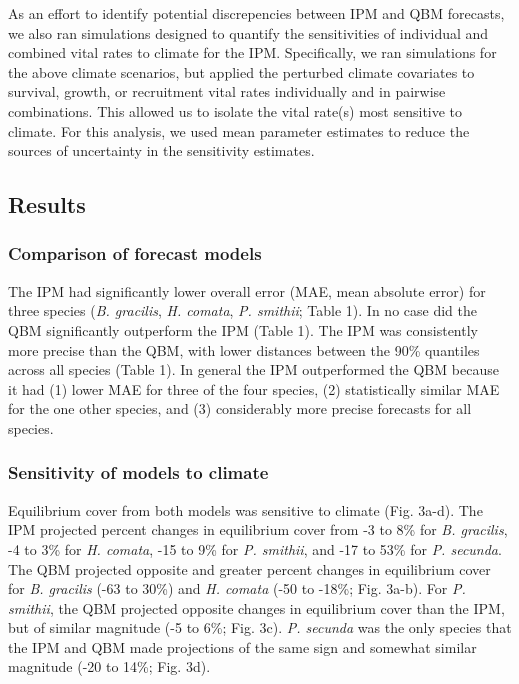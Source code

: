 \documentclass[12pt,]{article}
\begin{document}
As an effort to identify potential discrepencies between IPM and QBM
forecasts, we also ran simulations designed to quantify the
sensitivities of individual and combined vital rates to climate for the
IPM. Specifically, we ran simulations for the above climate scenarios,
but applied the perturbed climate covariates to survival, growth, or
recruitment vital rates individually and in pairwise combinations. This
allowed us to isolate the vital rate(s) most sensitive to climate. For
this analysis, we used mean parameter estimates to reduce the sources of
uncertainty in the sensitivity estimates.

\subsection{Results}\label{results}

\subsubsection{Comparison of forecast
models}\label{comparison-of-forecast-models}

The IPM had significantly lower overall error (MAE, mean absolute error)
for three species (\emph{B. gracilis}, \emph{H. comata}, \emph{P.
smithii}; Table 1). In no case did the QBM significantly outperform the
IPM (Table 1). The IPM was consistently more precise than the QBM, with
lower distances between the 90\% quantiles across all species (Table 1).
In general the IPM outperformed the QBM because it had (1) lower MAE for
three of the four species, (2) statistically similar MAE for the one
other species, and (3) considerably more precise forecasts for all
species.

\subsubsection{Sensitivity of models to
climate}\label{sensitivity-of-models-to-climate}

Equilibrium cover from both models was sensitive to climate (Fig. 3a-d).
The IPM projected percent changes in equilibrium cover from -3 to 8\%
for \emph{B. gracilis}, -4 to 3\% for \emph{H. comata}, -15 to 9\% for
\emph{P. smithii}, and -17 to 53\% for \emph{P. secunda}. The QBM
projected opposite and greater percent changes in equilibrium cover for
\emph{B. gracilis} (-63 to 30\%) and \emph{H. comata} (-50 to -18\%;
Fig. 3a-b). For \emph{P. smithii}, the QBM projected opposite changes in
equilibrium cover than the IPM, but of similar magnitude (-5 to 6\%;
Fig. 3c). \emph{P. secunda} was the only species that the IPM and QBM
made projections of the same sign and somewhat similar magnitude (-20 to
14\%; Fig. 3d).
\end{document}
